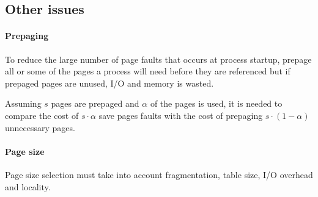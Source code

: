 \subsection{Other issues}
\paragraph{Prepaging}
To reduce the large number of page faults that occurs at process startup, prepage all or some of the pages a process will need before they are referenced but if prepaged pages are unused, I/O and memory is wasted.

Assuming $s$ pages are prepaged and $\alpha$ of the pages is used, it is needed to compare the cost of $s \cdot \alpha$ save pages faults with the cost of prepaging $s \cdot (1-\alpha)$ unnecessary pages.

\paragraph{Page size}
Page size selection must take into account fragmentation, table size, I/O overhead and locality.